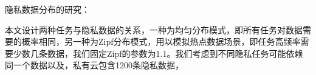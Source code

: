 隐私数据分布的研究：

本文设计两种任务与隐私数据的关系，一种为均匀分布模式，即所有任务对数据需要的概率相同，另一种为Zipf分布模式，用以模拟热点数据场景，即任务高频率需要少数几条数据，我们固定Zipf的参数为1.1。我们考虑到不同隐私任务可能依赖同一个数据以及，私有云包含1200条隐私数据，



